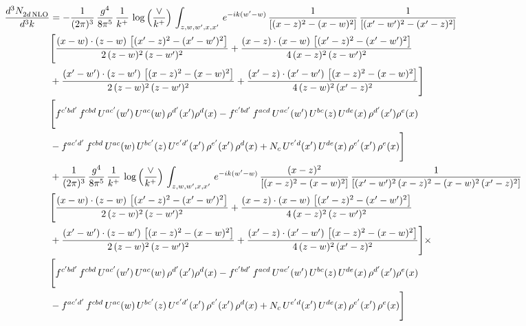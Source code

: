 \documentclass[9pt]{article}
\numberwithin{equation}{section}
\begin{document}
\begin{align}
 \frac{d^{3}N_{2d\,\rm NLO}^{\rm}}{d^{3}k}  & =  -\frac{1}{(2\pi)^{3}}\, \frac{g^{4}}{8\pi^{5}}\,\frac{1}{k^{+}}\,\log{\left(\frac{\vee}{k^{+}}\right)}\,\int_{z,w,w^{\prime},x,x'}\, e^{-ik(w^{\prime}-w)}\,\frac{1}{\left[(x-z)^{2}-(x-w)^{2}\right]}\, \frac{1}{\left[(x'-w')^{2}-(x'-z)^{2}\right]}\notag \\ & \Bigg[\frac{(x-w)\cdot (z-w)\, \left[(x'-z)^{2}-(x'-w')^{2}\right]}{2\, (z-w)^{2}\, (z-w')^{2}}  + \frac{(x-z)\cdot (x-w)\,\left[(x'-z)^{2}-(x'-w')^{2}\right] }{4\,(x-z)^{2}\,(z-w')^{2}}\notag \\ & +\frac{(x'-w')\cdot (z-w')\, \left[(x-z)^{2}-(x-w)^{2}\right]}{2\, (z-w)^{2}\, (z-w')^{2}}+ \frac{(x'-z)\cdot (x'-w')\, \left[(x-z)^{2}-(x-w)^{2}\right]}{4\, (z-w)^{2}\,(x'-z)^{2}}\Bigg] \notag \\ &  \Bigg[f^{c'bd'}\,f^{cbd}\, U^{ac'}(w')\,U^{ac}(w)\,\rho^{d'}(x')\rho^{d}(x)- f^{c'bd'}\,f^{acd}\,U^{ac'}(w')\,U^{bc}(z)\,U^{de}(x)\,\rho^{d'}(x')\rho^{e}(x) \notag \\ & -f^{ac'd'}\,f^{cbd}\,U^{ac}(w)\,U^{bc'}(z)\,U^{e'd'}(x')\,\rho^{e'}(x')\,\rho^{d}(x) +N_{c}\,U^{e'd}(x')\,U^{de}(x)\,\rho^{e'}(x')\,\rho^{e}(x)\Bigg]  \notag \\
& +\frac{1}{(2\pi)^{3}}\, \frac{g^{4}}{8\pi^{5}}\,\frac{1}{k^{+}}\,\log{\left(\frac{\vee}{k^{+}}\right)}\,\int_{z,w,w^{\prime},x,x'}\, e^{-ik(w^{\prime}-w)}\,\frac{(x-z)^{2}}{\left[(x-z)^{2}-(x-w)^{2}\right]}\,\frac{1}{\left[(x'-w')^{2}\,(x-z)^{2} - (x-w)^{2}\,(x'-z)^{2}\right]}\notag \\ & \Bigg[\frac{(x-w)\cdot (z-w)\, \left[(x'-z)^{2}-(x'-w')^{2}\right]}{2\, (z-w)^{2}\, (z-w')^{2}}  + \frac{(x-z)\cdot (x-w)\,\left[(x'-z)^{2}-(x'-w')^{2}\right] }{4\,(x-z)^{2}\,(z-w')^{2}}\notag \\ & +\frac{(x'-w')\cdot (z-w')\, \left[(x-z)^{2}-(x-w)^{2}\right]}{2\, (z-w)^{2}\, (z-w')^{2}}+ \frac{(x'-z)\cdot (x'-w')\, \left[(x-z)^{2}-(x-w)^{2}\right]}{4\, (z-w)^{2}\,(x'-z)^{2}}\Bigg]\times\,\notag \\ & \Bigg[f^{c'bd'}\,f^{cbd}\, U^{ac'}(w')\,U^{ac}(w)\,\rho^{d'}(x')\rho^{d}(x)- f^{c'bd'}\,f^{acd}\,U^{ac'}(w')\,U^{bc}(z)\,U^{de}(x)\,\rho^{d'}(x')\rho^{e}(x) \notag \\ & -f^{ac'd'}\,f^{cbd}\,U^{ac}(w)\,U^{bc'}(z)\,U^{e'd'}(x')\,\rho^{e'}(x')\,\rho^{d}(x) +N_{c}\,U^{e'd}(x')\,U^{de}(x)\,\rho^{e'}(x')\,\rho^{e}(x)\Bigg] \notag \\

\end{align}
\end{document}

